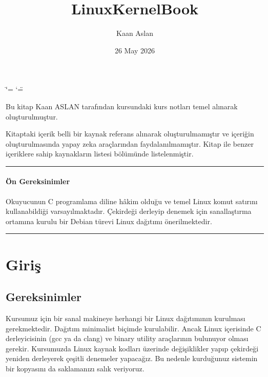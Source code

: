 \documentclass[a4paper,10pt,turkish]{sphinxmanual}
\title{LinuxKernelBook}
\date{26 May 2026}
\author{Kaan Aslan}
\begin{document}
\ifdefined\shorthandoff
  \ifnum\catcode`\=\string=\active\shorthandoff{=}\fi
  \ifnum\catcode`\"=\active{}\fi
\fi

\pagestyle{empty}
\sphinxmaketitle
\pagestyle{plain}
\sphinxtableofcontents
\pagestyle{normal}
\label{\detokenize{index::doc}}


\sphinxAtStartPar
Bu kitap Kaan ASLAN tarafından   kursundaki kurs notları temel alınarak oluşturulmuştur.

\sphinxAtStartPar
Kitaptaki içerik belli bir kaynak referans alınarak oluşturulmamıştır ve içeriğin oluşturulmasında yapay zeka araçlarından
faydalanılmamıştır. Kitap ile benzer içeriklere sahip kaynakların listesi  bölümünde listelenmiştir.


\bigskip\hrule\bigskip

\subsubsection*{Ön Gereksinimler}

\sphinxAtStartPar
Okuyucunun C programlama diline hâkim olduğu ve temel Linux komut satırını
kullanabildiği varsayılmaktadır. Çekirdeği derleyip denemek için sanallaştırma
ortamına kurulu bir Debian türevi Linux dağıtımı önerilmektedir.


\bigskip\hrule\bigskip


\sphinxstepscope


\chapter{Giriş}
\label{\detokenize{introduction:giris}}\label{\detokenize{introduction:id1}}\label{\detokenize{introduction::doc}}

\section{Gereksinimler}
\label{\detokenize{introduction:gereksinimler}}
\sphinxAtStartPar
Kursumuz için bir sanal makineye herhangi bir Linux dağıtımının kurulması gerekmektedir.
Dağıtım minimalist biçimde kurulabilir. Ancak Linux içerisinde C derleyicisinin (gcc ya da
clang) ve binary utility araçlarının bulunuyor olması gerekir. Kursumuzda Linux kaynak
kodları üzerinde değişiklikler yapıp çekirdeği yeniden derleyerek çeşitli denemeler
yapacağız. Bu nedenle kurduğunuz sistemin bir kopyasını da saklamanızı salık veriyoruz.
\end{document}
